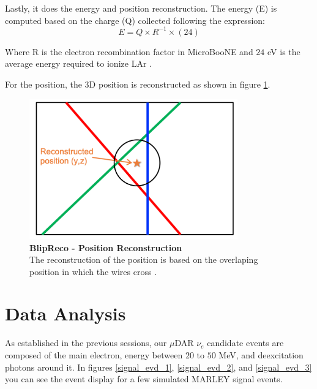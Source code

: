 Lastly, it does the energy and position reconstruction. The energy (E) is computed based on the charge (Q) collected following the expression:
\begin{equation}
    E=Q\times R^{-1} \times (24)
\end{equation}

Where R is the electron recombination factor in MicroBooNE and $24$ eV is the average energy required to ionize LAr \cite{lariat_calorimetry_lar}. 

For the position, the 3D position is reconstructed as shown in figure \ref{blip_position}. 

\begin{figure}[h!]
    \centering
    \includegraphics[width=90mm]{Figures/blip_reco_position.png}
    \caption[BlipReco - Position Reconstruction]{{\textbf{BlipReco - Position Reconstruction}}\\ The reconstruction of the position is based on the overlaping position in which the wires cross \cite{will_CM_Aug}.}
    \label{blip_position}
\end{figure}

\newpage
\section{Data Analysis}
As established in the previous sessions, our $\mu$DAR $\nu_e$ candidate events are composed of the main electron, energy between $20$ to $50$ MeV, and deexcitation photons around it. In figures \ref{signal_evd_1}, \ref{signal_evd_2}, and \ref{signal_evd_3} you can see the event display for a few simulated MARLEY signal events. 

